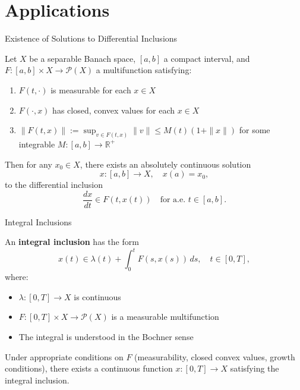 \documentclass[aspectratio=169,10pt]{beamer}
\begin{document}
\section{Applications}

\begin{frame}{Existence of Solutions to Differential Inclusions}
\begin{theorem}
Let $X$ be a separable Banach space, $[a, b]$ a compact interval, and $F: [a, b] \times X \to \mathcal{P}(X)$ a multifunction satisfying:

\begin{enumerate}
    \item $F(t, \cdot)$ is measurable for each $x \in X$
    \item $F(\cdot, x)$ has closed, convex values for each $x \in X$
    \item $\|F(t, x)\| := \sup_{v \in F(t,x)} \|v\| \le M(t)(1 + \|x\|)$ for some integrable $M: [a,b] \to \mathbb{R}^+$
\end{enumerate}

Then for any $x_0 \in X$, there exists an absolutely continuous solution
$$x: [a, b] \to X, \quad x(a) = x_0,$$
to the differential inclusion
$$\frac{dx}{dt} \in F(t, x(t)) \quad \text{for a.e. } t \in [a, b].$$
\end{theorem}
\end{frame}

\begin{frame}{Integral Inclusions}
\begin{definition}
An \textbf{integral inclusion} has the form
$$x(t) \in \lambda(t) + \int_0^t F(s, x(s)) \, ds, \quad t \in [0, T],$$
where:
\begin{itemize}
    \item $\lambda: [0, T] \to X$ is continuous
    \item $F: [0, T] \times X \to \mathcal{P}(X)$ is a measurable multifunction
    \item The integral is understood in the Bochner sense
\end{itemize}
\end{definition}

\vspace{0.3cm}

\begin{theorem}
Under appropriate conditions on $F$ (measurability, closed convex values, growth conditions), there exists a continuous function $x: [0, T] \to X$ satisfying the integral inclusion.
\end{theorem}
\end{frame}
\end{document}
